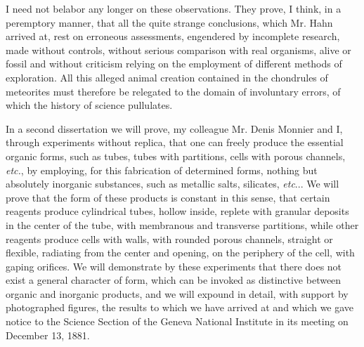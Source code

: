 \documentclass[a4paper, 12pt, oneside]{article}
\begin{document}
I need not belabor any longer on these observations. They prove, I think, in a peremptory manner, that all the quite strange conclusions, which Mr. Hahn arrived at, rest on erroneous assessments, engendered by incomplete research, made without controls, without serious comparison with real organisms, alive or fossil and without criticism relying on the employment of different methods of exploration. All this alleged animal creation contained in the chondrules of meteorites must therefore be relegated to the domain of involuntary errors, of which the history of science pullulates.

In a second dissertation we will prove, my colleague Mr. Denis Monnier and I, through experiments without replica, that one can freely produce the essential organic forms, such as tubes, tubes with partitions, cells with porous channels, \emph{etc.}, by employing, for this fabrication of determined forms, nothing but absolutely inorganic substances, such as metallic salts, silicates, \emph{etc}... We will prove that the form of these products is constant in this sense, that certain reagents produce cylindrical tubes, hollow inside, replete with granular deposits in the center of the tube, with membranous and transverse partitions, while other reagents produce cells with walls, with rounded porous channels, straight or flexible, radiating from the center and opening, on the periphery of the cell, with gaping orifices. We will demonstrate by these experiments that there does not exist a general character of form, which can be invoked as distinctive between organic and inorganic products, and we will expound in detail, with support by photographed figures, the results to which we have arrived at and which we gave notice to the Science Section of the Geneva National Institute in its meeting on December 13, 1881.
\end{document}
